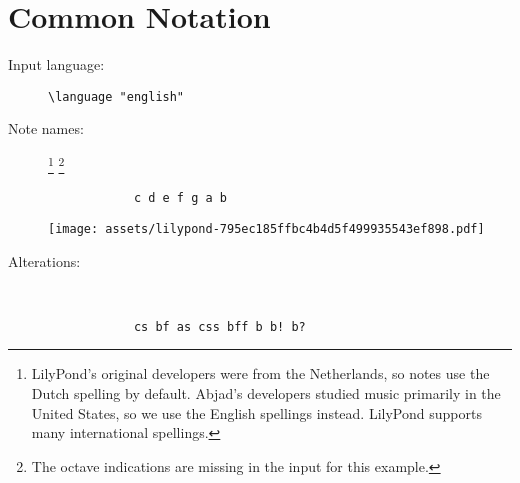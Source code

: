\documentclass[a4paper]{tufte-handout}
\newenvironment{abjadbookoutput}{}{}
\begin{document}
\hrulefill{}

\pagebreak

\section{Common Notation}

\begin{description}
    \item[Input language:]
        \hfill \verb|\language "english"|

    \item[Note names:]\footnote{%
        LilyPond's original developers were from the Netherlands, so notes use
        the Dutch spelling by default. Abjad's developers studied music
        primarily in the United States, so we use the English spellings
        instead. LilyPond supports many international spellings.}
        \footnote{The octave indications are missing in the input for this example.}
        \hfill \vspace{-\baselineskip} \\
        \begin{multicols}{2}

            \begin{verbatim}
            c d e f g a b
            \end{verbatim}

            \begin{comment}
            <lilypond>[stylesheet=stylesheet-minimal.ily]
            { c' d' e' f' g' a' b'}
            </lilypond>
            \end{comment}

            \begin{abjadbookoutput}
            \noindent\texttt{[image: assets/lilypond-795ec185ffbc4b4d5f499935543ef898.pdf]}
            \end{abjadbookoutput}

        \end{multicols}

    \item[Alterations:]
        \hfill \vspace{-\baselineskip} \\
        \begin{multicols}{2}

            \begin{verbatim}
            cs bf as css bff b b! b?
            \end{verbatim}


\end{multicols}
\end{description}
\end{document}

